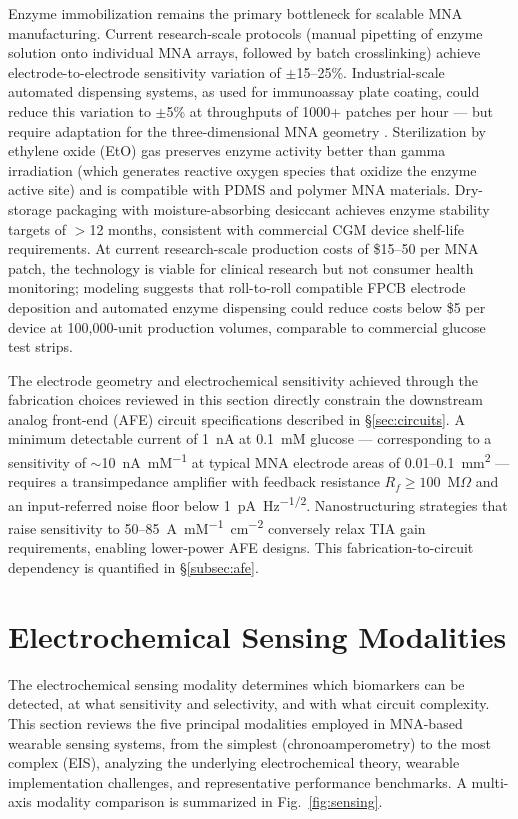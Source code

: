 \documentclass[review,1p]{elsarticle}
\begin{document}
Enzyme immobilization remains the primary bottleneck for scalable MNA manufacturing. Current research-scale protocols (manual pipetting of enzyme solution onto individual MNA arrays, followed by batch crosslinking) achieve electrode-to-electrode sensitivity variation of $\pm$15--25\%. Industrial-scale automated dispensing systems, as used for immunoassay plate coating, could reduce this variation to $\pm$5\% at throughputs of 1000+ patches per hour — but require adaptation for the three-dimensional MNA geometry \cite{Friedel2023}. Sterilization by ethylene oxide (EtO) gas preserves enzyme activity better than gamma irradiation (which generates reactive oxygen species that oxidize the enzyme active site) and is compatible with PDMS and polymer MNA materials. Dry-storage packaging with moisture-absorbing desiccant achieves enzyme stability targets of $>$12 months, consistent with commercial CGM device shelf-life requirements. At current research-scale production costs of \$15--50 per MNA patch, the technology is viable for clinical research but not consumer health monitoring; modeling suggests that roll-to-roll compatible FPCB electrode deposition and automated enzyme dispensing could reduce costs below \$5 per device at 100,000-unit production volumes, comparable to commercial glucose test strips.

The electrode geometry and electrochemical sensitivity achieved through the fabrication choices reviewed in this section directly constrain the downstream analog front-end (AFE) circuit specifications described in \S\ref{sec:circuits}. A minimum detectable current of 1~nA at 0.1~mM glucose — corresponding to a sensitivity of $\sim$10~nA~mM\textsuperscript{$-1$} at typical MNA electrode areas of 0.01--0.1~mm\textsuperscript{2} — requires a transimpedance amplifier with feedback resistance $R_f \geq 100$~M$\Omega$ and an input-referred noise floor below 1~pA~Hz\textsuperscript{$-1/2$}. Nanostructuring strategies that raise sensitivity to 50--85~\textmu{}A~mM\textsuperscript{$-1$}~cm\textsuperscript{$-2$} conversely relax TIA gain requirements, enabling lower-power AFE designs. This fabrication-to-circuit dependency is quantified in \S\ref{subsec:afe}.


\section{Electrochemical Sensing Modalities}
\label{sec:sensing}

The electrochemical sensing modality determines which biomarkers can be detected, at what sensitivity and selectivity, and with what circuit complexity. This section reviews the five principal modalities employed in MNA-based wearable sensing systems, from the simplest (chronoamperometry) to the most complex (EIS), analyzing the underlying electrochemical theory, wearable implementation challenges, and representative performance benchmarks. A multi-axis modality comparison is summarized in Fig.~\ref{fig:sensing}.
\end{document}

